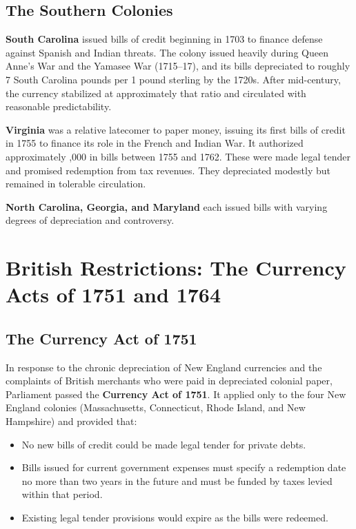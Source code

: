\documentclass[12pt]{article}
\begin{document}
\subsection{The Southern Colonies}

\textbf{South Carolina} issued bills of credit beginning in 1703 to finance
defense against Spanish and Indian threats.  The colony issued heavily during
Queen Anne's War and the Yamasee War (1715--17), and its bills depreciated to
roughly 7 South Carolina pounds per 1 pound sterling by the 1720s.  After
mid-century, the currency stabilized at approximately that ratio and circulated
with reasonable predictability.

\textbf{Virginia} was a relative latecomer to paper money, issuing its first
bills of credit in 1755 to finance its role in the French and Indian War.  It
authorized approximately ,000 in bills between 1755 and 1762.
These were made legal tender and promised redemption from tax revenues.  They
depreciated modestly but remained in tolerable circulation.

\textbf{North Carolina, Georgia, and Maryland} each issued bills with varying
degrees of depreciation and controversy.

\section{British Restrictions: The Currency Acts of 1751 and 1764}

\subsection{The Currency Act of 1751}

In response to the chronic depreciation of New England currencies and the
complaints of British merchants who were paid in depreciated colonial paper,
Parliament passed the \textbf{Currency Act of 1751}.  It applied only to the
four New England colonies (Massachusetts, Connecticut, Rhode Island, and
New Hampshire) and provided that:

\begin{itemize}[nosep]
    \item No new bills of credit could be made legal tender for private debts.
    \item Bills issued for current government expenses must specify a
          redemption date no more than two years in the future and must be
          funded by taxes levied within that period.
    \item Existing legal tender provisions would expire as the bills were
          redeemed.
\end{itemize}
\end{document}
